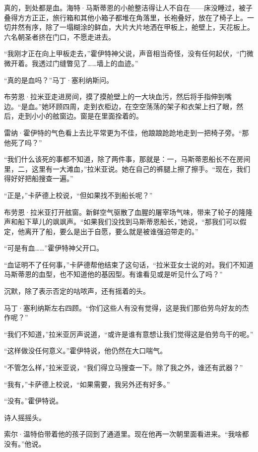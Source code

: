 \documentclass[AutoFakeBold=true]{book}
\begin{document}
\vspace*{1em}

真的，到处都是血。海特·马斯蒂恩的小舱整洁得让人不自在——床没睡过，被子叠得方方正正，旅行箱和其他小箱子都堆在角落里，长袍叠好，放在了椅子上。一切井然有序，除了一塌糊涂的鲜血，大片大片地洒在甲板上，舱壁上，天花板上。六名朝圣者挤在门口，不愿走进去。

``我刚才正在向上甲板走去，''霍伊特神父说，声音相当奇怪，没有任何起伏，``门微微开着。我透过门缝瞥见了……墙上的血迹。''

``真的是血吗？''马丁·塞利纳斯问。

布劳恩·拉米亚走进房间，摸了摸舱壁上的一大块血污，然后将手指伸到嘴边。``是血。''她环顾四周，走到衣柜边，在空空荡荡的架子和衣架上扫了眼，然后，走到小小的舷窗边。窗是在里面拴着的。

雷纳·霍伊特的气色看上去比平常更为不佳，他踉踉跄跄地走到一把椅子旁。``那他死了吗？''

``我们什么该死的事都不知道，除了两件事，那就是：一，马斯蒂恩船长不在房间里，二，这里有一大滩血，''拉米亚说。她在自己的裤腿上擦了擦手。``现在，我们得好好把船搜查一遍。''

``正是，''卡萨德上校说，``但如果找不到船长呢？''

布劳恩·拉米亚打开舷窗。新鲜空气驱散了血腥的屠宰场气味，带来了轮子的隆隆声和船下草儿的飒飒声。``如果我们没找到马斯蒂恩船长，''她说，``那我们可以假定，他离开了船，要么是出于自愿，要么就是被谁强迫带走的。''

``可是有{\kaishu 血}……''霍伊特神父开口。

``血证明不了任何事，''卡萨德帮他结束了这句话，``拉米亚女士说的对。我们不知道马斯蒂恩的血型，也不知道他的基因型。有谁看见或是听见{\kaishu 什么}了吗？''

沉默，除了表示否定的咕哝声，还有摇着的头。

马丁·塞利纳斯左右四顾。``你们这些人有没有觉得，这是我们那伯劳鸟好友的杰作呢？''

``我们不知道，''拉米亚厉声说道，``或许是谁有意想让我们觉得这是伯劳鸟干的呢。''

``这样做没任何意义。''霍伊特说，他仍然在大口喘气。

``不管怎么样，''拉米亚说，``我们得立马搜查一下。除了我之外，谁还有武器？''

``我有，''卡萨德上校说，``如果需要，我另外还有好多。''

``没有。''霍伊特说。

诗人摇摇头。

索尔·温特伯带着他的孩子回到了通道里。现在他再一次朝里面看进来。``我啥都没有。''他说。
\end{document}
